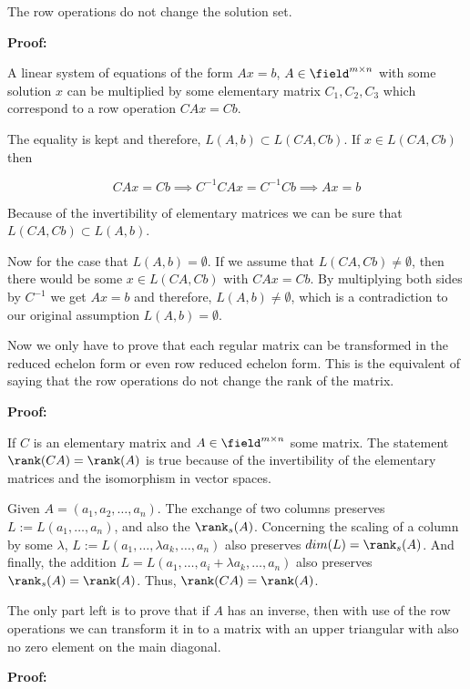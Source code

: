 The row operations do not change the solution set.

\textbf{Proof:}

A linear system of equations of the form \(Ax = b\), \(A \in \field^{m \times n}\) with some solution
\(x\) can be multiplied by some elementary matrix \(C_1, C_2, C_3\) which correspond to a row
operation \(CAx = Cb\).

The equality is kept and therefore, \(L(A,b) \subset L(CA, Cb)\). If \(x \in L(CA, Cb)\) then

\[
    CAx = Cb \implies C^{-1}CAx = C^{-1}Cb \implies Ax = b
\]

Because of the invertibility of elementary matrices we can be sure that  \(L(CA, Cb) \subset L(A,b) \).

Now for the case that \(L(A,b) = \emptyset\). If we assume that \(L(CA,Cb) \ne \emptyset \), then
there would be some \(x \in L(CA,Cb)\) with \(CAx = Cb\). By multiplying both sides by \(C^{-1}\) we
get \(Ax = b\) and therefore, \(L(A, b) \ne \emptyset \), which is a contradiction to our original
assumption \(L(A,b) = \emptyset\).

\QED

Now we only have to prove that each regular matrix can be transformed in the reduced echelon form or
even row reduced echelon form. This is the equivalent of saying that the row operations do not change
the rank of the matrix.

\textbf{Proof:}

If \(C\) is an elementary matrix and \(A \in \field^{m \times n}\) some matrix. The statement \(\rank(CA) = \rank(A)\)
is true because of the invertibility of the elementary matrices and the isomorphism in vector spaces.

Given \(A = (a_1, a_2, \dots, a_n)\). The exchange of two columns preserves \(L := L(a_1, \dots, a_n)\),
and also the \(\rank_s (A)\). Concerning the scaling of a column by some \(\lambda \), \(L := L(a_1, \dots, \lambda a_k, \dots, a_n)\)
also preserves \(dim(L) = \rank_s(A)\). And finally, the addition \(L = L(a_1, \dots, a_i + \lambda a_k, \dots, a_n)\) also preserves
\(\rank_s (A) = \rank(A)\). Thus, \(\rank(CA) = \rank(A)\).

\QED

The only part left is to prove that if \(A\) has an inverse, then with use of the row operations we can
transform it in to a matrix with an upper triangular with also no zero element on the main diagonal.

\textbf{Proof:}

